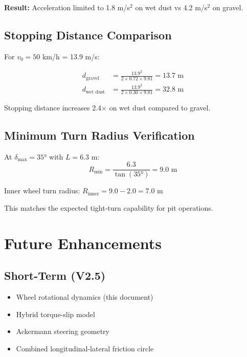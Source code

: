\documentclass[11pt,a4paper]{article}
\begin{document}
\textbf{Result:} Acceleration limited to 1.8 m/s$^2$ on wet dust vs 4.2 m/s$^2$ on gravel.

\subsection{Stopping Distance Comparison}

For $v_0 = 50$ km/h = 13.9 m/s:

\begin{align}
d_{\text{gravel}} &= \frac{13.9^2}{2 \times 0.72 \times 9.81} = 13.7 \text{ m} \\
d_{\text{wet dust}} &= \frac{13.9^2}{2 \times 0.30 \times 9.81} = 32.8 \text{ m}
\end{align}

Stopping distance increases 2.4$\times$ on wet dust compared to gravel.

\subsection{Minimum Turn Radius Verification}

At $\delta_{\max} = 35°$ with $L = 6.3$ m:
\begin{equation}
R_{\min} = \frac{6.3}{\tan(35°)} = 9.0 \text{ m}
\end{equation}

Inner wheel turn radius: $R_{\text{inner}} = 9.0 - 2.0 = 7.0$ m

This matches the expected tight-turn capability for pit operations.

\section{Future Enhancements}

\subsection{Short-Term (V2.5)}
\begin{itemize}
    \item[$\checkmark$] Wheel rotational dynamics (this document)
    \item[$\checkmark$] Hybrid torque-slip model
    \item[$\checkmark$] Ackermann steering geometry
    \item Combined longitudinal-lateral friction circle
\end{itemize}
\end{document}
